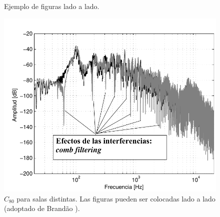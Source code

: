 \documentclass[12pt, a4paper, twoside, twocolumn]{article}
\begin{document}
\begin{figure}[H]
  \centering
	\qquad
  \caption{Ejemplo de figuras lado a lado.}
  \label{subfig.exemplo}
\end{figure}

\begin{figure}[ht!]
	\centering \vspace{-3mm}
        \includegraphics[width=0.98\linewidth,page=1]{figs/Combfilter-Brandao-2017-sp.pdf}
        \vspace{-0.4em}
        \caption{$C_{80}$ para salas distintas. Las figuras pueden ser colocadas lado a lado (adoptado de Brandão \cite{Brandao-2017}).}
	\label{fig:C80}%
\end{figure}
\end{document}
